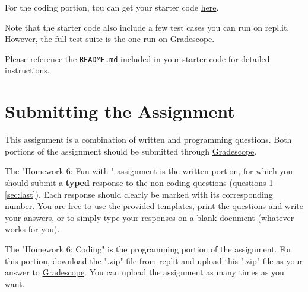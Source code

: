 \documentclass [12pt]{article}
\begin{document}
For the coding portion, tou can get your starter code \href{https://replit.com/team/COMP285/HW6-Code}{here}.

Note that the starter code also include a few test cases you can run on repl.it. However, the full test suite is the one run on Gradescope.

Please reference the \texttt{README.md} included in your starter code for detailed instructions.

\section*{Submitting the Assignment}

This assignment is a combination of written and programming questions. Both portions of the assignment should be submitted through \href{https://www.gradescope.com/courses/350304}{Gradescope}.

The "Homework 6: Fun with " assignment is the written portion, for which you should submit a \textbf{typed} response to the non-coding questions (questions 1-\ref{sec:last}). Each response should clearly be marked with its corresponding number. You are free to use the provided templates, print the questions and write your answers, or to simply type your responses on a blank document (whatever works for you).

The "Homework 6: Coding" is the programming portion of the assignment. For this portion, download the ".zip" file from replit and upload this ".zip" file as your answer to \href{https://www.gradescope.com/courses/350304}{Gradescope}. You can upload the assignment as many times as you want.
\end{document}

